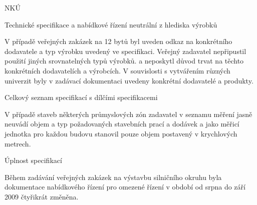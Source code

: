 \documentclass[10pt]{article}
\begin{document}
NKÚ



Technické specifikace a nabídkové řízení neutrální z hlediska výrobků

V případě veřejných zakázek na 12 bytů byl uveden odkaz na konkrétního dodavatele a typ výrobku uvedený ve specifikaci.
Veřejný zadavatel nepřipustil použití jiných srovnatelných typů výrobků. a neposkytl důvod trvat na těchto konkrétních dodavatelích a výrobcích.
V souvislosti s vytvářením různých univerzit byly v zadávací dokumentaci uvedeny konkrétní dodavatelé a produkty.


Celkový seznam specifikací s dílčími specifikacemi

V případě staveb některých průmyslových zón zadavatel v seznamu měření jasně neuvádí objem a typ požadovaných stavebních prací a dodávek a jako měřicí jednotka pro každou budovu stanovil pouze objem postavený v krychlových metrech.


Úplnost specifikací

Během zadávání veřejných zakázek na výstavbu silničního okruhu byla dokumentace nabídkového řízení pro omezené řízení v období od srpna do září 2009 čtyřikrát změněna.
\end{document}
